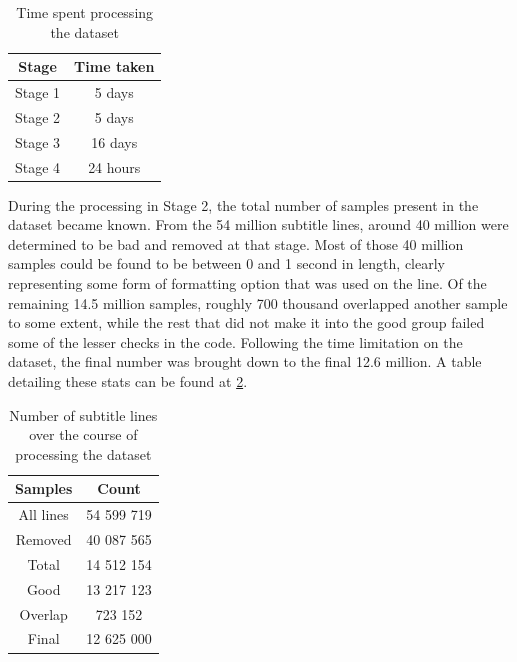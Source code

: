 \begin{table}[ht]
    \centering
    \begin{tabular}{|c|c|}
        \hline
        Stage & Time taken\\ \hline
        Stage 1 & 5 days\\ \hline
        Stage 2 & 5 days\\ \hline
        Stage 3 & 16 days\\ \hline
        Stage 4 & 24 hours\\ \hline
    \end{tabular}
    \caption{Time spent processing the dataset}
    \label{tab:datasettimetable}
\end{table}

During the processing in Stage 2, the total number of samples present in the dataset became known.
From the 54 million subtitle lines, around 40 million were determined to be bad and removed at that stage.
Most of those 40 million samples could be found to be between 0 and 1 second in length, clearly representing some form of formatting option that was used on the line.
Of the remaining 14.5 million samples, roughly 700 thousand overlapped another sample to some extent, while the rest that did not make it into the good group failed some of the lesser checks in the code.
Following the time limitation on the dataset, the final number was brought down to the final 12.6 million.
A table detailing these stats can be found at \cref{tab:samplecounttable}.

\begin{table}[ht]
    \centering
    \begin{tabular}{|c|c|}
        \hline
        Samples & Count\\ \hline
        All lines & 54 599 719\\ \hline
        Removed & 40 087 565\\ \hline
        Total & 14 512 154\\ \hline
        Good & 13 217 123\\ \hline
        Overlap & 723 152\\ \hline
        Final & 12 625 000\\ \hline
    \end{tabular}
    \caption{Number of subtitle lines over the course of processing the dataset}
    \label{tab:samplecounttable}
\end{table}

